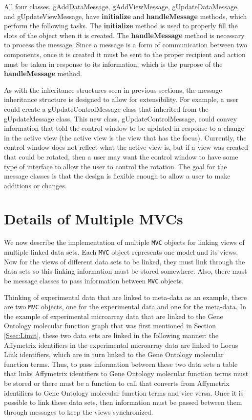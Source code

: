 \documentclass{article}[11pt]
\newcommand{\Rfunction}[1]{{\textbf{#1}}}
\newcommand{\Robject}[1]{{\texttt{#1}}}
\newcommand{\Rclass}[1]{\textsf{#1}}
\begin{document}
All four classes, \Rclass{gAddDataMessage}, \Rclass{gAddViewMessage},
\Rclass{gUpdateDataMessage}, and \Rclass{gUpdateViewMessage}, have
\Rfunction{initialize} and \Rfunction{handleMessage} methods, which perform
the following tasks.  The \Rfunction{initialize} method is used to properly
fill the slots of the object when it is created.  The
\Rfunction{handleMessage} method is necessary to process the message.  Since a
message is a form of communication between two components, once it is created
it must be sent to the proper recipient and action must be taken in response
to its information, which is the purpose of the \Rfunction{handleMessage}
method. 

As with the inheritance structures seen in previous sections, the message
inheritance structure is designed to allow for extensibility.  For example, a
user could create a \Rclass{gUpdateControlMessage} class that inherited from
the \Rclass{gUpdateMessage} class.  This new class,
\Rclass{gUpdateControlMessage}, could convey information that told the
control window to be updated in response to a change in the active view (the
active view is the view that has the focus).  Currently, the control window
does not reflect what the active view is, but if a view was created that could
be rotated, then a user may want the control window to have some type of
interface to allow the user to control the rotation.  The goal for the message
classes is that the design is flexible enough to allow a user to make
additions or changes. 

\section{Details of Multiple MVCs}\label{Sec:MultMVC}

We now describe the implementation of multiple \Robject{MVC} objects for
linking views of multiple linked data sets.  Each \Robject{MVC} object
represents one model and its views.  Now for the
views of different data sets to be linked, they must link through
the data sets so this linking information must be stored somewhere.  Also,
there must be message classes to pass information between
\Robject{MVC} objects. 

Thinking of experimental data that are linked to meta-data as an example, there
are two \Robject{MVC} objects, one for the experimental data and one for the
meta-data.  In the example of experimental microarray data that are linked to
the Gene Ontology molecular function graph that was first mentioned in Section
\ref{Ssec:Limit}, these two data sets are linked in the following manner: the
Affymetrix identifiers in the experimental microarray data are linked to Locus
Link identifiers, which are in turn linked to the Gene Ontology molecular
function terms.  Thus, to pass information between these two data sets a table
that links Affymetrix identifiers to Gene Ontology molecular function terms
must be stored or there must be a function to call that converts from
Affymetrix identifiers to Gene Ontology molecular function terms and vice
versa.  Once it is possible to link these data sets, then information must be
passed between them through messages to keep the views synchronized.
\end{document}
